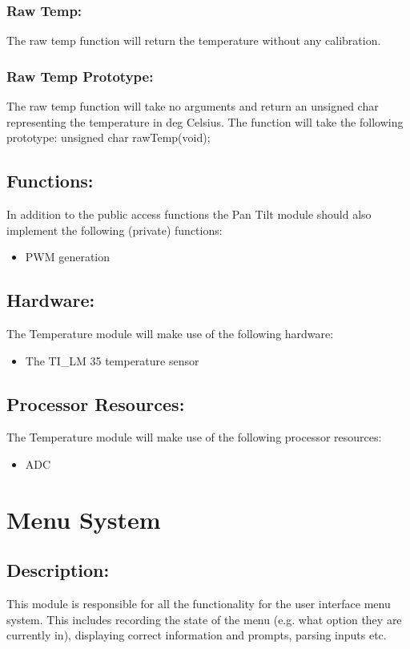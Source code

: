 \documentclass[]{article}
\begin{document}
\subsubsection{Raw Temp:}
The raw temp function will return the temperature without any calibration.

\subsubsection{Raw Temp Prototype:}
The raw temp function will take no arguments and return an unsigned char representing the temperature in deg Celsius. The function will take the following prototype: \newline \newline
unsigned char rawTemp(void);

\subsection{Functions:}
In addition to the public access functions the Pan Tilt module should also implement the following (private) functions:
\begin{itemize}
	\item PWM generation
\end{itemize}

\subsection{Hardware:}
The Temperature module will make use of the following hardware:
\begin{itemize}
	\item The TI\_LM 35 temperature sensor
\end{itemize}

\subsection{Processor Resources:}
The Temperature module will make use of the following processor resources:

\begin{itemize}
	\item ADC
\end{itemize}

\newpage
\section{Menu System}
\subsection{Description:}
This module is responsible for all the functionality for the user interface menu system. This includes recording the state of the menu (e.g. what option they are currently in), displaying correct information and prompts, parsing inputs etc.
\end{document}
